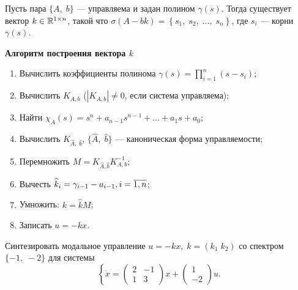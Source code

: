 \documentclass[../../TAU.tex]{subfiles}
\begin{document}
    \begin{theor} 
        Пусть пара $\{A,\; b\}$ --- управляема и задан полином $\gamma(s)$. Тогда существует вектор 
        $k\in\mathbb{R}^{1\times n}$, 
        такой что 
        $\sigma(A-bk) = \left\{s_1,\; s_2,\;\ldots,\; s_n\right\}$, где $s_i$ --- корни $\gamma(s)$.
    \end{theor}

    \textbf{Алгоритм построения вектора $k$}

    \begin{enumerate}
    \item 
        Вычислить коэффициенты полинома $\gamma(s) = \prod_{i=1}^{n}(s-s_i)$;
    \item 
        Вычислить $K_{A,b}$ ($|K_{A,b}|\neq0$, если система управляема);
    \item 
        Найти $\chi_A(s) = s^n + a_{n-1}s^{n-1} + \ldots + a_1 s + a_0$;
    \item 
        Вычислить $K_{\widehat A,\; \widehat b}$, $\{\widehat A,\; \widehat b\}$ --- каноническая форма управляемости;
    \item 
        Перемножить $M = K_{\widehat A, \widehat b} K^{-1}_{A,b}$;
    \item 
        Вычесть $\widehat k_i = \gamma_{i-1} - a_{i-1}, i=\overline{1,n}$;
    \item 
        Умножить: $k = \widehat k M$;
    \item 
        Записать $u = -k x$.
    \end{enumerate}

    \examp Синтезировать модальное управление $u = - k x, \; k = (k_1\; k_2)$ со спектром $\{-1,\; -2\}$ для системы
    $$
        \left\{
        \dot x =
        \begin{pmatrix}
            2 & -1\\
            1 & 3
        \end{pmatrix}
         x + \begin{pmatrix}1\\ -2\end{pmatrix}u\right..
    $$
\end{document}
